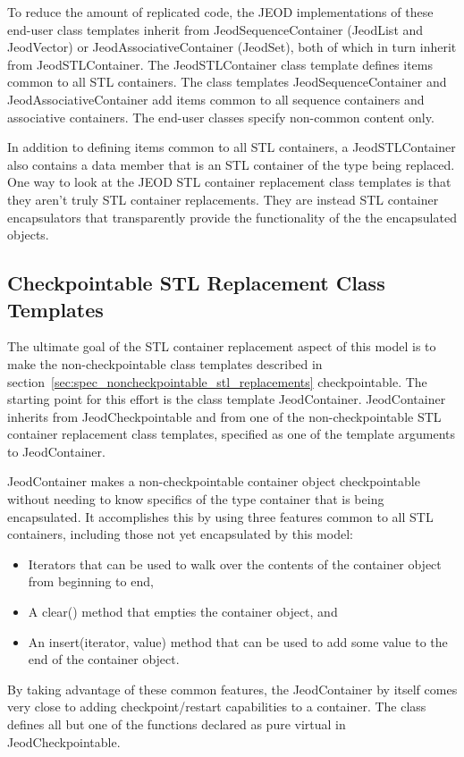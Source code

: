 To reduce the amount of replicated code, the JEOD implementations of these
end-user class templates inherit from JeodSequenceContainer (JeodList and
JeodVector) or JeodAssociativeContainer (JeodSet), both of which in turn
inherit from JeodSTLContainer.
The JeodSTLContainer class template defines items common to all STL
containers. The class templates JeodSequenceContainer and
JeodAssociativeContainer add items
common to all sequence containers and associative containers. The end-user
classes specify non-common content only.

In addition to defining items common to all STL containers, a JeodSTLContainer
also contains a data member that is an STL container of the type being
replaced. One way to look at the JEOD STL container replacement class templates
is that they aren't truly STL container replacements. They are instead STL
container encapsulators that transparently provide the functionality of
the the encapsulated objects.

\subsection{Checkpointable STL Replacement Class Templates}
The ultimate goal of the STL container replacement aspect of this model is
to make the non-checkpointable class templates described in
section~\ref{sec:spec_noncheckpointable_stl_replacements} checkpointable.
The starting point for this effort is the class template JeodContainer.
JeodContainer inherits from JeodCheckpointable and from one of the
non-checkpointable STL container replacement class templates, specified as one
of the template arguments to JeodContainer.

JeodContainer makes a non-checkpointable container object checkpointable
without needing to know specifics of the type container that is being
encapsulated. It accomplishes this by using three features common to all STL
containers, including those not yet encapsulated by this model:
\begin{itemize}
\item Iterators that can be used to walk over the
contents of the container object from beginning to end,
\item A clear() method that empties the container object, and
\item An insert(iterator, value) method that can be
used to add some value to the end of the container object.
\end{itemize}
By taking advantage of these common features, the JeodContainer by itself
comes very close to adding checkpoint/restart capabilities to a container.
The class defines all but one of the functions declared as pure virtual
in JeodCheckpointable.

